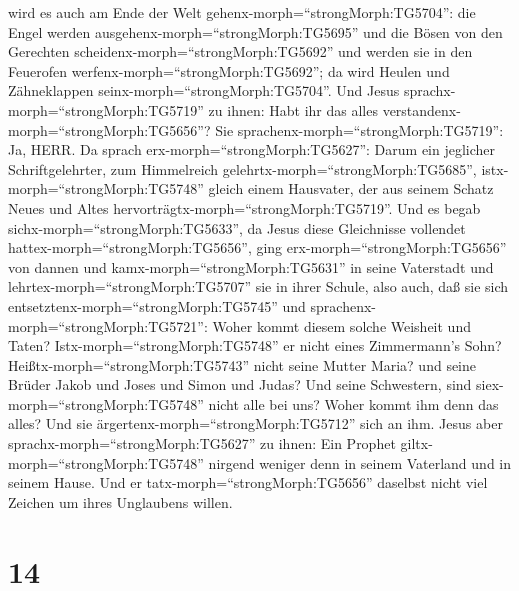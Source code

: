 wird es auch am Ende der Welt gehenx-morph=``strongMorph:TG5704'': die
Engel werden ausgehenx-morph=``strongMorph:TG5695'' und die Bösen von
den Gerechten scheidenx-morph=``strongMorph:TG5692''  und
werden sie in den Feuerofen werfenx-morph=``strongMorph:TG5692''; da
wird Heulen und Zähneklappen seinx-morph=``strongMorph:TG5704''.
 Und Jesus sprachx-morph=``strongMorph:TG5719'' zu ihnen:
Habt ihr das alles verstandenx-morph=``strongMorph:TG5656''? Sie
sprachenx-morph=``strongMorph:TG5719'': Ja, HERR.  Da
sprach erx-morph=``strongMorph:TG5627'': Darum ein jeglicher
Schriftgelehrter, zum Himmelreich gelehrtx-morph=``strongMorph:TG5685'',
istx-morph=``strongMorph:TG5748'' gleich einem Hausvater, der aus seinem
Schatz Neues und Altes hervorträgtx-morph=``strongMorph:TG5719''.
 Und es begab sichx-morph=``strongMorph:TG5633'', da Jesus
diese Gleichnisse vollendet hattex-morph=``strongMorph:TG5656'', ging
erx-morph=``strongMorph:TG5656'' von dannen  und
kamx-morph=``strongMorph:TG5631'' in seine Vaterstadt und
lehrtex-morph=``strongMorph:TG5707'' sie in ihrer Schule, also auch, daß
sie sich entsetztenx-morph=``strongMorph:TG5745'' und
sprachenx-morph=``strongMorph:TG5721'': Woher kommt diesem solche
Weisheit und Taten?  Istx-morph=``strongMorph:TG5748'' er
nicht eines Zimmermann's Sohn? Heißtx-morph=``strongMorph:TG5743'' nicht
seine Mutter Maria? und seine Brüder Jakob und Joses und Simon und
Judas?  Und seine Schwestern, sind
siex-morph=``strongMorph:TG5748'' nicht alle bei uns? Woher kommt ihm
denn das alles?  Und sie
ärgertenx-morph=``strongMorph:TG5712'' sich an ihm. Jesus aber
sprachx-morph=``strongMorph:TG5627'' zu ihnen: Ein Prophet
giltx-morph=``strongMorph:TG5748'' nirgend weniger denn in seinem
Vaterland und in seinem Hause.  Und er
tatx-morph=``strongMorph:TG5656'' daselbst nicht viel Zeichen um ihres
Unglaubens willen.

\hypertarget{section-13}{%
\section{14}\label{section-13}}

